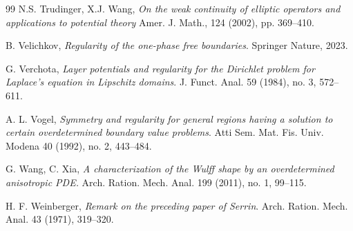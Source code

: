 \documentclass[reqno,11pt]{amsart}
\numberwithin{equation}{section}
\theoremstyle{remark}
\begin{document}
\begin{thebibliography}{99}
N.S. Trudinger, X.J. Wang, \emph{On the weak continuity of elliptic operators and applications to potential theory}
Amer. J. Math., 124 (2002), pp. 369--410.

 

B. Velichkov, \emph{Regularity of the one-phase free boundaries}. Springer Nature, 2023.

G. Verchota, 
\emph{Layer potentials and regularity for the Dirichlet problem for Laplace's equation in Lipschitz domains}.
J. Funct. Anal. 59 (1984), no. 3, 572--611.

A. L. Vogel, \emph{Symmetry and regularity for general regions having a solution to certain overdetermined boundary value problems}. Atti Sem. Mat. Fis. Univ. Modena 40 (1992), no. 2, 443--484. 

G. Wang, C. Xia, 
\emph{A characterization of the Wulff shape by an overdetermined anisotropic PDE.}
Arch. Ration. Mech. Anal. 199 (2011), no. 1, 99--115.

H. F. Weinberger, \emph{Remark on the preceding paper of Serrin}. Arch. Ration. Mech. Anal.
43 (1971), 319--320.

\end{thebibliography}
\end{document}
